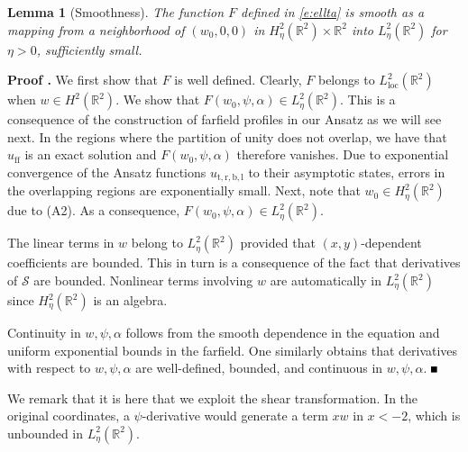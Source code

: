 \documentclass[10pt]{article}
\newtheorem{Lemma}{Lemma}[section]
\newenvironment{Proof}[1][\unskip]%
 {\begin{trivlist} \item[]{\bf Proof #1. }}%
 {\hspace*{\fill}$\rule{.4\baselineskip}{.4\baselineskip}$\end{trivlist}}
\newcommand{\R}{\mathbb{R}}
\begin{document}
\begin{Lemma}[Smoothness]\label{l:sm}
The function $F$ defined in \eqref{e:ellta} is smooth as a mapping from a neighborhood of $(w_0,0,0)$ in $H^2_\eta(\R^2)\times\R^2$ into $L^2_\eta(\R^2)$ for $\eta>0$, sufficiently small.
\end{Lemma}
\begin{Proof}
We first show that $F$ is well defined. Clearly, $F$ belongs to $L^2_\mathrm{loc}(\R^2)$ when $w\in H^2(\R^2)$. We show that $F(w_0,\psi,\alpha)\in L^2_\eta(\R^2)$.  This is a consequence of the construction of farfield profiles in our Ansatz as we will see next. In the regions where the partition of unity does not overlap, we have that  $u_\mathrm{ff}$ is an exact solution and $F(w_0,\psi,\alpha)$ therefore vanishes. Due to exponential convergence of the Ansatz functions $u_\mathrm{t,r,b,l}$ to their asymptotic states, errors in the overlapping regions are exponentially small.  Next, note that $w_0\in H^2_\eta(\R^2)$ due to (A2). As a consequence,  $F(w_0,\psi,\alpha)\in L^2_\eta(\R^2)$. 

The  linear terms in $w$ belong to $L^2_\eta(\R^2)$ provided that $(x,y)$-dependent coefficients are bounded. This in turn is a consequence of the fact that derivatives of $\mathcal{S}$ are bounded. Nonlinear terms involving $w$ are automatically in $L^2_\eta(\R^2)$ since $H^2_\eta(\R^2)$ is an algebra. 

Continuity in $w,\psi,\alpha$ follows from the smooth dependence in the equation and uniform exponential bounds in the farfield. One similarly obtains that derivatives with respect to  $w,\psi,\alpha$ are well-defined, bounded, and continuous in $w,\psi,\alpha$.
\end{Proof}

We remark that it is here that we exploit the shear transformation. In the original coordinates, a $\psi$-derivative would generate a term $xw$ in $x<-2$, which is unbounded in $L^2_\eta(\R^2)$. 
\end{document}
